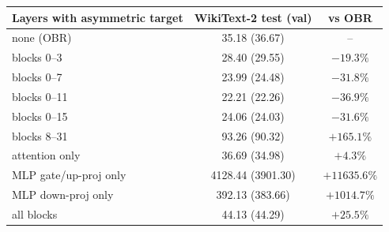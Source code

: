 \begin{tabular}{lcc}
\toprule
Layers with asymmetric target & WikiText-2 test (val) & vs OBR \\
\midrule
none (OBR) & 35.18 (36.67) & -- \\
blocks 0--3 & 28.40 (29.55) & $-19.3\%$ \\
blocks 0--7 & 23.99 (24.48) & $-31.8\%$ \\
blocks 0--11 & 22.21 (22.26) & $-36.9\%$ \\
blocks 0--15 & 24.06 (24.03) & $-31.6\%$ \\
blocks 8--31 & 93.26 (90.32) & $+165.1\%$ \\
attention only & 36.69 (34.98) & $+4.3\%$ \\
MLP gate/up-proj only & 4128.44 (3901.30) & $+11635.6\%$ \\
MLP down-proj only & 392.13 (383.66) & $+1014.7\%$ \\
all blocks & 44.13 (44.29) & $+25.5\%$ \\
\bottomrule
\end{tabular}
